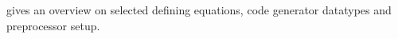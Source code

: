 \begin{isabellebody}
\begin{isamarkuptext}
\begin{descr}
  \item [\hyperlink{command.HOL.print-codesetup}{\mbox{\isa{\isacommand{print{\isacharunderscore}codesetup}}}}] gives an overview on
  selected defining equations, code generator datatypes and
  preprocessor setup.

  \end{descr}%
\end{isamarkuptext}%
\isamarkuptrue%
%
\isadelimtheory
%
\endisadelimtheory
%
\isatagtheory
{}\isamarkupfalse%
%
\endisatagtheory
{\isafoldtheory}%
%
\isadelimtheory
%
\endisadelimtheory
\isanewline
\isanewline
\end{isabellebody}%
